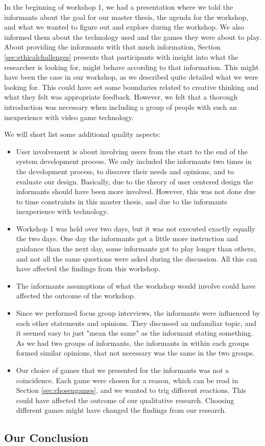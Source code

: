 In the beginning of workshop 1, we had a presentation where we told the informants about the goal for our master thesis, the agenda for the workshop, and what we wanted to figure out and explore during the workshop. We also informed them about the technology used and the games they were about to play. About providing the informants with that much information, Section \ref{sec:ethicalchallenges} presents that participants with insight into what the researcher is looking for, might behave according to that information. This might have been the case in our workshop, as we described quite detailed what we were looking for. This could have set some boundaries related to creative thinking and what they felt was appropriate feedback. However, we felt that a thorough introduction was necessary when including a group of people with such an inexperience with video game technology. 

We will short list some additional quality aspects: 
\begin{itemize}
\renewcommand{\labelitemi}{$\bullet$}
\item User involvement is about involving users from the start to the end of the system development process. We only included the informants two times in the development process, to discover their needs and opinions, and to evaluate our design. Basically, due to the theory of user centered design the informants should have been more involved. However, this was not done due to time constraints in this master thesis, and due to the informants inexperience with technology. 
\item Workshop 1 was held over two days, but it was not executed exactly equally the two days. One day the informants got a little more instruction and guidance than the next day, some informants got to play longer than others, and not all the same questions were asked during the discussion. All this can have affected the findings from this workshop. 
\item The informants assumptions of what the workshop would involve could have affected the outcome of the workshop. 
\item Since we performed focus group interviews, the informants were influenced by each other statements and opinions. They discussed an unfamiliar topic, and it seemed easy to just "mean the same" as the informant stating something. As we had two groups of informants, the informants in within each groups formed similar opinions, that not necessary was the same in the two groups.   
\item Our choice of games that we presented for the informants was not a coincidence. Each game were chosen for a reason, which can be read in Section \ref{sec:chosengames}, and we wanted to trig different reactions. This could have affected the outcome of our qualitative research. Choosing different games might have changed the findings from our research. 
\end{itemize}

\subsection{Our Conclusion}

